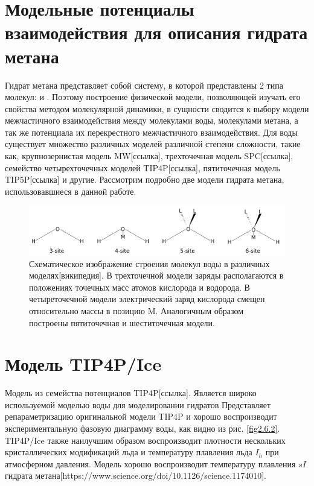 \section{Модельные потенциалы взаимодействия для описания гидрата метана}
Гидрат метана представляет собой систему, в которой представлены 2 типа молекул:  и . Поэтому построение физической модели, позволяющей изучать его свойства методом молекулярной динамики, в сущности сводится к выбору модели межчастичного взаимодействия между молекулами воды, молекулами метана, а так же потенциала их перекрестного межчастичного взаимодействия. Для воды существует множество различных моделей различной степени сложности, такие как, крупнозернистая модель MW[ссылка], трехточечная модель SPC[ссылка], семейство четырехточечных моделей TIP4P[ссылка], пятиточечная модель TIP5P[ссылка] и другие. Рассмотрим подробно две модели гидрата метана, использовавшиеся в данной работе. 
\begin{figure}[H]
    \centering
    \includegraphics[width=.9\linewidth]{figures/watermodels.png}
    \caption{Схематическое изображение строения молекул воды в различных моделях[википедия]. В трехточечной модели заряды располагаются в положениях точечных масс атомов кислорода и водорода. В четыреточечной модели электрический заряд кислорода смещен относительно массы в позицию M. Аналогичным образом построены пятиточечная и шеститочечная модели.}
    \label{fig2.6.1}
\end{figure}

\section{Модель TIP4P/Ice}
Модель из семейства потенциалов TIP4P[ссылка]. Является широко используемой моделью воды для моделировании гидратов Представляет репараметризацию оригинальной модели TIP4P и хорошо воспроизводит экспериментальную фазовую диаграмму воды, как видно из рис. \ref{fig2.6.2}. TIP4P/Ice также наилучшим образом воспроизводит плотности нескольких кристаллических модификаций льда и температуру плавления льда $I_h$ при атмосферном давления. Модель хорошо воспроизводит температуру плавления $sI$ гидрата метана[https://www.science.org/doi/10.1126/science.1174010].

